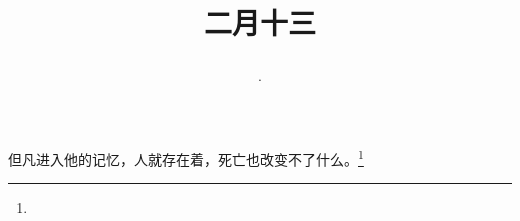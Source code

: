 \title{\date[d=22,m=3,y=2024][year:cn-y,年,month:cn,day:cn,日,·,weekday]·二月十三 }
但凡进入他的记忆，人就存在着，死亡也改变不了什么。\footnote{ }

